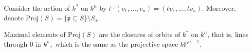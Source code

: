 Consider the action of \(k^*\) on \(k^n\) by \(t \cdot (v_1, \dotsc, v_n) = (tv_1, \dotsc, tv_n).\) Moreover, denote
\(\mathrm{Proj} (S) = \{ \mathfrak p \subseteq S\} \setminus S_+.\)

\begin{corollary}
  Maximal elements of \(\mathrm{Proj}(S)\) are the closures of orbits of \(k^*\) on \(k^n\), that is, lines through \(0\) in \(k^n,\) which is the same as the projective space \(k \mathbb P^{n-1}.\)
\end{corollary}



